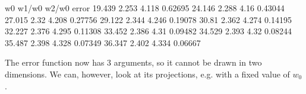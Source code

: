 \documentclass[letterpaper,10pt,english]{jupyterBook}
\begin{document}
\begin{sphinxVerbatim}[commandchars=\\\{\}]
   w0   w1/w0  w2/w0 error
\PYGZhy{}19.439 2.253 \PYGZhy{}4.118 0.62695
\PYGZhy{}24.146 2.288 \PYGZhy{}4.16 0.43044
\PYGZhy{}27.015 2.32 \PYGZhy{}4.208 0.27756
\PYGZhy{}29.122 2.344 \PYGZhy{}4.246 0.19078
\PYGZhy{}30.81 2.362 \PYGZhy{}4.274 0.14195
\PYGZhy{}32.227 2.376 \PYGZhy{}4.295 0.11308
\PYGZhy{}33.452 2.386 \PYGZhy{}4.31 0.09482
\PYGZhy{}34.529 2.393 \PYGZhy{}4.32 0.08244
\PYGZhy{}35.487 2.398 \PYGZhy{}4.328 0.07349
\PYGZhy{}36.347 2.402 \PYGZhy{}4.334 0.06667
\end{sphinxVerbatim}

\sphinxAtStartPar
The error function now has 3 arguments, so it cannot be drawn in two dimensions. We can, however, look at its projections, e.g. with a fixed value of \( w_0 \).
\end{document}
